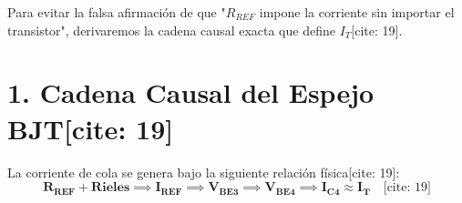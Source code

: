 \documentclass[11pt, a4paper]{article}
\begin{document}
\begin{tcolorbox}[colback=ucbblue!5, colframe=ucbblue, title=\textbf{Theory Burst: El Espejo de Corriente y Efectos de $\beta$ Finito}]
    Para evitar la falsa afirmación de que "$R_{REF}$ impone la corriente sin importar el transistor", derivaremos la cadena causal exacta que define $I_T$[cite: 19].
\end{tcolorbox}

\section*{1. Cadena Causal del Espejo BJT[cite: 19]}
La corriente de cola se genera bajo la siguiente relación física[cite: 19]:
\begin{equation*}
    \mathbf{R_{REF} + \text{Rieles} \implies I_{REF} \implies V_{BE3} \implies V_{BE4} \implies I_{C4} \approx I_T} \quad \text{[cite: 19]}
\end{equation*}
\end{document}
